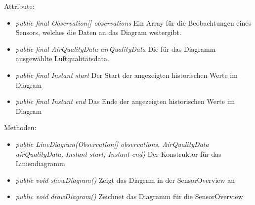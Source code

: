 Attribute:
\begin{itemize} 
    \item \emph{public final Observation[] observations} Ein Array für die Beobachtungen eines Sensors, welches die Daten an das Diagram weitergibt.
    \item \emph{public final AirQualityData airQualityData} Die für das Diagramm ausgewählte Luftqualitätsdata.
    \item \emph{public final Instant start} Der Start der angezeigten historischen Werte im Diagram
    \item \emph{public final Instant end} Das Ende der angezeigten historischen Werte im Diagram
\end{itemize}   
Methoden:
\begin{itemize}      
    \item \emph{public LineDiagram(Observation[] observations, AirQualityData airQualityData, Instant start, Instant end)} Der Konstruktor für das Liniendiagramm
    \item \emph{public void showDiagram()} Zeigt das Diagram in der SensorOverview an
    \item \emph{public void drawDiagram()} Zeichnet das Diagramm für die SensorOverview
\end{itemize}